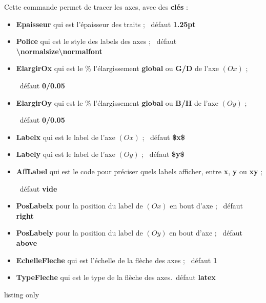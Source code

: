 \documentclass[a4paper,french,11pt]{article}
\newcommand\cmaj[1]{%
	{\tcbox[vignetteMaJ]{#1}\xspace}%
}
\newcommand\Cle[1]{{\bfseries\sffamily\textlangle \textcolor{orange!75!black}{#1}\textrangle}}
\begin{document}
\begin{cautionblock}
Cette commande permet de tracer les axes, avec des \Cle{clés} :

\begin{itemize}
	\item \Cle{Epaisseur} qui est l'épaisseur des traits ; \hfill~défaut \Cle{1.25pt}
	\item \Cle{Police} qui est le style des labels des axes  ; \hfill~défaut \Cle{\textbackslash{}normalsize\textbackslash{}normalfont}
	\item \cmaj{2.1.2} \Cle{ElargirOx} qui est le \% l'élargissement \Cle{global} ou \Cle{G/D} de l'axe $(Ox)$ ;
	
	\hfill~défaut \Cle{0/0.05}
	\item \cmaj{2.1.2} \Cle{ElargirOy} qui est le \% l'élargissement \Cle{global} ou \Cle{B/H} de l'axe $(Oy)$ ;
	
	\hfill~défaut \Cle{0/0.05}
	\item \Cle{Labelx} qui est le label de l'axe $(Ox)$ ; \hfill~défaut \Cle{\${}x\$}
	\item \Cle{Labely} qui est le label de l'axe $(Oy)$ ; \hfill~défaut \Cle{\${}y\$}
	\item \Cle{AffLabel} qui est le code pour préciser quels labels afficher, entre \Cle{x}, \Cle{y} ou \Cle{xy} ;
	
	\hfill~défaut \Cle{vide}
	\item \Cle{PosLabelx} pour la position du label de $(Ox)$ en bout d'axe ; \hfill~défaut \Cle{right}
	\item \Cle{PosLabely} pour la position du label de $(Oy)$ en bout d'axe ; \hfill~défaut \Cle{above}
	\item \Cle{EchelleFleche} qui est l'échelle de la flèche des axes ; \hfill~défaut \Cle{1}
	\item \Cle{TypeFleche} qui est le type de la flèche des axes.\hfill~défaut \Cle{latex}
\end{itemize}
\vspace*{-\baselineskip}\leavevmode
\end{cautionblock}

\begin{PresCodeTexPL}{listing only}
	\AxesTikz

	\AxesTikz%
		[AffLabel=xy,Labelx={Année},Labely={Altitude},%
		PosLabelx={below right},PosLabely={above left},%
		Police=\small\sffamily]
\end{PresCodeTexPL}
\end{document}
